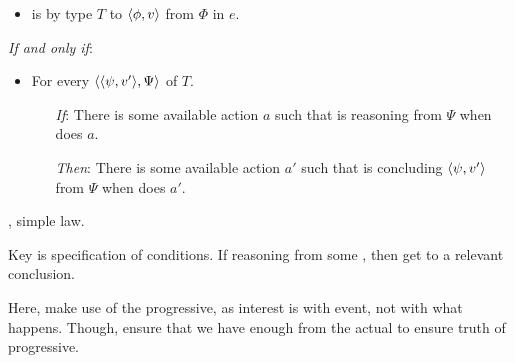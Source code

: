 \begin{note}
    \begin{definition}[\ptC{2}]
    \label{def:ptC}

    \noindent%

    \begin{itemize}
    \item
      \vAgent{} is \emph{} by type \(T\) to \(\langle \phi, v \rangle\) from \(\Phi\) in \(e\).
    \end{itemize}

    \emph{If and only if}:

    \begin{itemize}[noitemsep]
    \item
      For every \tI{} \(\langle \langle \psi, v' \rangle, \Psi \rangle\) of \(T\).
      \begin{itemize}[noitemsep]
      \item[\emph{If}:]
        There is some available action \(a\) such that \vAgent{} is reasoning from \(\Psi\) when \vAgent{} does \(a\).
      \item[\emph{Then}:]
        There is some available action \(a'\) such that \vAgent{} is concluding \(\langle \psi, v' \rangle\) from \(\Psi\) when \vAgent{} does \(a'\).
      \end{itemize}
    \end{itemize}
    \vspace{-\baselineskip}
  \end{definition}
\end{note}

\begin{note}
  , simple law.

  Key is specification of conditions.
  If reasoning from some \pool{}, then get to a relevant conclusion.

  Here, make use of the progressive, as interest is with event, not with what happens.
  Though, ensure that we have enough from the actual to ensure truth of progressive.
\end{note}

